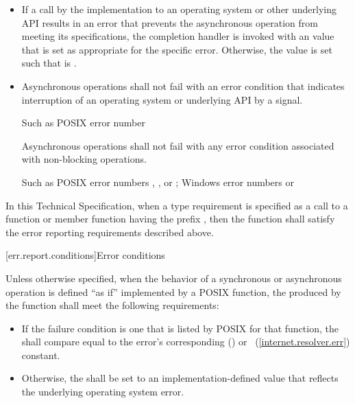 \begin{itemize}
\item
If a call by the implementation to an operating system or other underlying API results in an error that prevents the asynchronous operation from meeting its specifications, the completion handler is invoked with an  value  that is set as appropriate for the specific error. Otherwise, the  value  is set such that  is .

\item
Asynchronous operations shall not fail with an error condition that indicates interruption of an operating system or underlying API by a signal. \begin{note} Such as POSIX error number  \end{note} Asynchronous operations shall not fail with any error condition associated with non-blocking operations. \begin{note} Such as POSIX error numbers , , or ; Windows error numbers  or  \end{note}
\end{itemize}

\pnum
In this Technical Specification, when a type requirement is specified as a call to a function or member function having the prefix , then the function shall satisfy the error reporting requirements described above.



[err.report.conditions]{Error conditions}

\pnum
Unless otherwise specified, when the behavior of a synchronous or asynchronous operation is defined ``as if'' implemented by a POSIX function, the  produced by the function shall meet the following requirements:

\begin{itemize}
\item
If the failure condition is one that is listed by POSIX for that function, the  shall compare equal to the error's corresponding  () or ~(\ref{internet.resolver.err}) constant.

\item
Otherwise, the  shall be set to an implementation-defined value that reflects the underlying operating system error.
\end{itemize}

